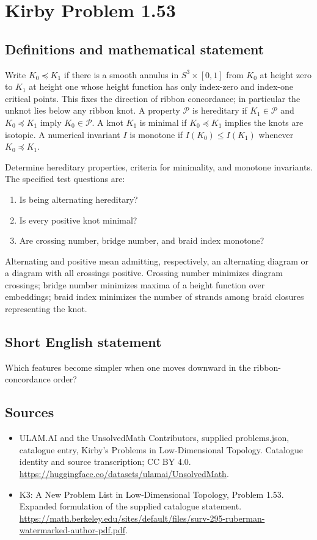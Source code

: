 \documentclass[11pt,a4paper]{article}
\begin{document}
\section*{Kirby Problem 1.53}\label{statement}

\subsection{Definitions and mathematical statement}
Write $K_0\preceq K_1$ if there is a smooth annulus in $S^3\times[0,1]$ from
$K_0$ at height zero to $K_1$ at height one whose height function has only
index-zero and index-one critical points. This fixes the direction of ribbon
concordance; in particular the unknot lies below any ribbon knot.
A property $\mathcal P$ is hereditary if $K_1\in\mathcal P$ and
$K_0\preceq K_1$ imply $K_0\in\mathcal P$. A knot $K_1$ is minimal if
$K_0\preceq K_1$ implies the knots are isotopic. A numerical invariant $I$ is
monotone if $I(K_0)\leq I(K_1)$ whenever $K_0\preceq K_1$.

Determine hereditary properties, criteria for minimality, and monotone
invariants. The specified test questions are:
\begin{enumerate}
\item Is being alternating hereditary?
\item Is every positive knot minimal?
\item Are crossing number, bridge number, and braid index monotone?
\end{enumerate}
Alternating and positive mean admitting, respectively, an alternating diagram
or a diagram with all crossings positive. Crossing number minimizes diagram
crossings; bridge number minimizes maxima of a height function over embeddings;
braid index minimizes the number of strands among braid closures representing
the knot.
\subsection{Short English statement}
Which features become simpler when one moves downward in the ribbon-concordance order?
\subsection{Sources}
\begin{itemize}
\item[S1] ULAM.AI and the UnsolvedMath Contributors, supplied problems.json, catalogue entry, Kirby's Problems in Low-Dimensional Topology. Catalogue identity and source transcription; CC BY 4.0.
\url{https://huggingface.co/datasets/ulamai/UnsolvedMath}.
\item[S2] K3: A New Problem List in Low-Dimensional Topology, Problem 1.53. Expanded formulation of the supplied catalogue statement.
\url{https://math.berkeley.edu/sites/default/files/surv-295-ruberman-watermarked-author-pdf.pdf}.
\end{itemize}
\end{document}
